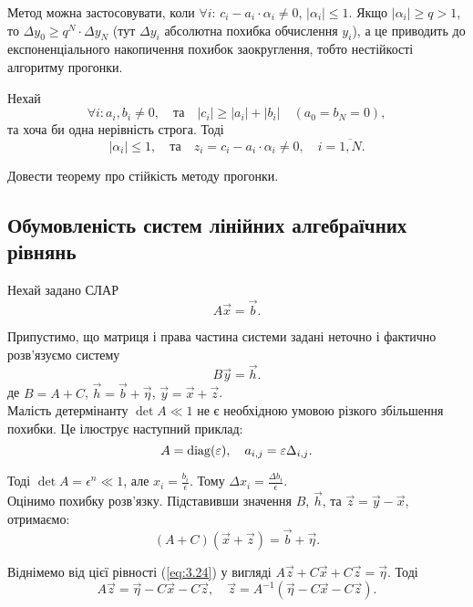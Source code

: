 Метод можна застосовувати, коли $\forall i$: $c_i - a_i\cdot\alpha_i \ne 0$, $|\alpha_i| \le 1$. Якщо $|\alpha_i| \ge q > 1$, то $\Delta y_0 \ge q^N\cdot\Delta y_N$ (тут $\Delta y_i$ абсолютна похибка обчислення $y_i$), а це приводить до експоненціального накопичення похибок заокруглення, тобто нестійкості алгоритму прогонки.

\begin{theorem}
Нехай \[ \forall i: a_i, b_i \ne 0, \quad \text{та} \quad |c_i| \ge |a_i| + |b_i| \quad (a_0 = b_N = 0),\] та хоча би одна нерівність строга. Тоді \[ |\alpha_i| \le 1, \quad \text{та} \quad z_i = c_i - a_i\cdot\alpha_i \ne 0, \quad i = \overline{1,N}.\]
\end{theorem}

\begin{problem}
	Довести теорему про стійкість методу прогонки.
\end{problem}

\subsection{Обумовленість систем лінійних алгебраїчних рівнянь}

Нехай задано СЛАР
\begin{equation}
	\label{eq:3.23}
	A \vec x = \vec b.
\end{equation}

Припустимо, що матриця і права частина системи задані неточно і фактично розв'язуємо систему
\begin{equation}
	\label{eq:3.24}
	B \vec y = \vec h.
\end{equation}
де $B = A + C$, $\vec h = \vec b + \vec \eta$, $\vec y = \vec x + \vec z$. \\

Малість детермінанту $\det A \ll 1$ не є необхідною умовою різкого збільшення похибки. Це ілюструє наступний приклад: \[A = \operatorname{diag}(\varepsilon), \quad a_{i,j} = \varepsilon \Delta_{i,j}.\]

Тоді $\det A = \epsilon^n \ll 1$, але $x_i = \frac{b_i}{\epsilon}$. Тому $\Delta x_i = \frac{\Delta b_i}{\epsilon}$. \\

Оцінимо похибку розв’язку. Підставивши значення $B$, $\vec h$, та $\vec z = \vec y - \vec x$, отримаємо: \[ (A+C)(\vec x + \vec z) = \vec b +\vec \eta.\]

Віднімемо від цієї рівності (\ref{eq:3.24}) у вигляді $A \vec z + C \vec x + C \vec z = \vec \eta$. Тоді
\[ A \vec z = \vec \eta - C \vec x - C \vec z, \quad \vec z = A^{-1}(\vec \eta - C \vec x - C \vec z).\]

